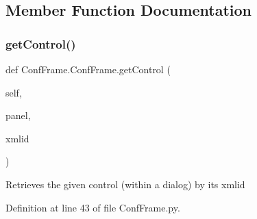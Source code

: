 \subsection{Member Function Documentation}
\mbox{\label{classConfFrame_1_1ConfFrame_ab41502e0a899a8632e507df007d2fed8}} 
\subsubsection{\texorpdfstring{get\+Control()}{getControl()}}
{\footnotesize\ttfamily def Conf\+Frame.\+Conf\+Frame.\+get\+Control (\begin{DoxyParamCaption}\item[{}]{self,  }\item[{}]{panel,  }\item[{}]{xmlid }\end{DoxyParamCaption})}

\begin{DoxyVerb}Retrieves the given control (within a dialog) by its xmlid\end{DoxyVerb}
 

Definition at line 43 of file Conf\+Frame.\+py.



